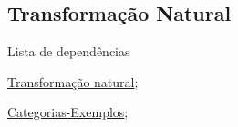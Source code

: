 \subsection{Transformação Natural}
\label{transformação-natural-categorias-ex}
\begin{titlemize}{Lista de dependências}
	\item \hyperref[transformação-natural-categorias-def]{Transformação natural};\\ %
	\item \hyperref[categorias-ex]{Categorias-Exemplos};\\
\end{titlemize}

